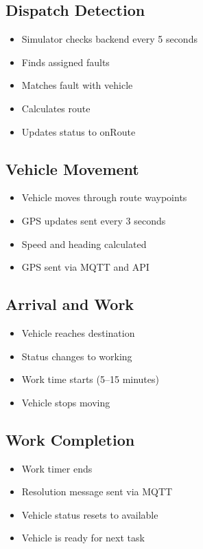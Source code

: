 \subsection{Dispatch Detection}
\begin{itemize}
    \item Simulator checks backend every 5 seconds
    \item Finds assigned faults
    \item Matches fault with vehicle
    \item Calculates route
    \item Updates status to onRoute
\end{itemize}

\subsection{Vehicle Movement}
\begin{itemize}
    \item Vehicle moves through route waypoints
    \item GPS updates sent every 3 seconds
    \item Speed and heading calculated
    \item GPS sent via MQTT and API
\end{itemize}

\subsection{Arrival and Work}
\begin{itemize}
    \item Vehicle reaches destination
    \item Status changes to working
    \item Work time starts (5–15 minutes)
    \item Vehicle stops moving
\end{itemize}

\subsection{Work Completion}
\begin{itemize}
    \item Work timer ends
    \item Resolution message sent via MQTT
    \item Vehicle status resets to available
    \item Vehicle is ready for next task
\end{itemize}

